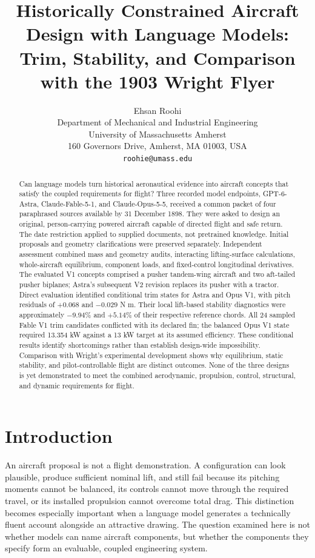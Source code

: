 \documentclass[11pt,a4paper]{article}
\title{Historically Constrained Aircraft Design with Language Models:\\Trim, Stability, and Comparison with the 1903 Wright Flyer}
\author{Ehsan Roohi\\
\small Department of Mechanical and Industrial Engineering\\
\small University of Massachusetts Amherst\\
\small 160 Governors Drive, Amherst, MA 01003, USA\\
\small\texttt{roohie@umass.edu}}
\date{}
\begin{document}
\maketitle

\begin{abstract}
Can language models turn historical aeronautical evidence into aircraft concepts that satisfy the coupled requirements for flight? Three recorded model endpoints, GPT-6-Astra, Claude-Fable-5-1, and Claude-Opus-5-5, received a common packet of four paraphrased sources available by 31 December 1898. They were asked to design an original, person-carrying powered aircraft capable of directed flight and safe return. The date restriction applied to supplied documents, not pretrained knowledge. Initial proposals and geometry clarifications were preserved separately. Independent assessment combined mass and geometry audits, interacting lifting-surface calculations, whole-aircraft equilibrium, component loads, and fixed-control longitudinal derivatives. The evaluated V1 concepts comprised a pusher tandem-wing aircraft and two aft-tailed pusher biplanes; Astra's subsequent V2 revision replaces its pusher with a tractor. Direct evaluation identified conditional trim states for Astra and Opus V1, with pitch residuals of $+0.068$ and $-0.029$ N m. Their local lift-based stability diagnostics were approximately $-9.94\%$ and $+5.14\%$ of their respective reference chords. All 24 sampled Fable V1 trim candidates conflicted with its declared fin; the balanced Opus V1 state required 13.354 kW against a 13 kW target at its assumed efficiency. These conditional results identify shortcomings rather than establish design-wide impossibility. Comparison with Wright's experimental development shows why equilibrium, static stability, and pilot-controllable flight are distinct outcomes. None of the three designs is yet demonstrated to meet the combined aerodynamic, propulsion, control, structural, and dynamic requirements for flight.
\end{abstract}

\section{Introduction}
An aircraft proposal is not a flight demonstration. A configuration can look plausible, produce sufficient nominal lift, and still fail because its pitching moments cannot be balanced, its controls cannot move through the required travel, or its installed propulsion cannot overcome total drag. This distinction becomes especially important when a language model generates a technically fluent account alongside an attractive drawing. The question examined here is not whether models can name aircraft components, but whether the components they specify form an evaluable, coupled engineering system.
\end{document}
